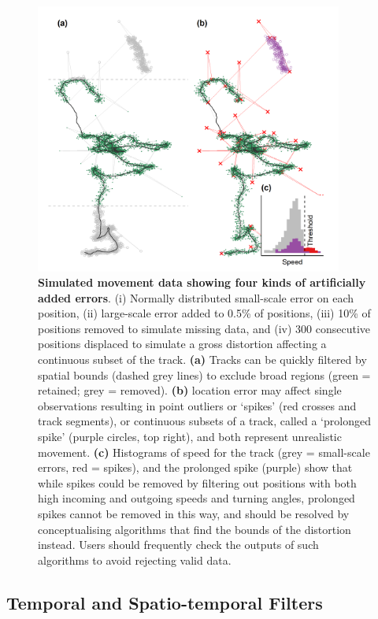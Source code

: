 \begin{figure}[ht!]
    \centering
    \includegraphics[width=0.9\textwidth]{figures/preprocessing/fig_03.png}
    \caption{
        \textbf{Simulated movement data showing four kinds of artificially added errors}.
        (i) Normally distributed small-scale error on each position, (ii) large-scale error added to 0.5\% of positions, (iii) 10\% of positions removed to simulate missing data, and (iv) 300 consecutive positions displaced to simulate a gross distortion affecting a continuous subset of the track.
        \textbf{(a)} Tracks can be quickly filtered by spatial bounds (dashed grey lines) to exclude broad regions (green = retained; grey = removed).
        \textbf{(b)} location error may affect single observations resulting in point outliers or `spikes' (red crosses and track segments), or continuous subsets of a track, called a `prolonged spike' (purple circles, top right), and both represent unrealistic movement.
        \textbf{(c)} Histograms of speed for the track (grey = small-scale errors, red = spikes), and the prolonged spike (purple) show that while spikes could be removed by filtering out positions with both high incoming and outgoing speeds and turning angles, prolonged spikes cannot be removed in this way, and should be resolved by conceptualising algorithms that find the bounds of the distortion instead.
        Users should frequently check the outputs of such algorithms to avoid rejecting valid data.
    }
    \label{preproc_fig_03}
\end{figure}

\subsection*{Temporal and Spatio-temporal Filters}

